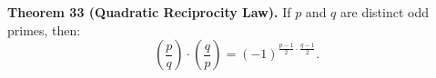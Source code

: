 \textbf{Theorem 33 (Quadratic Reciprocity Law).} If $p$ and $q$ are distinct odd primes, then:
$$\left(\frac{p}{q}\right) \cdot \left(\frac{q}{p}\right) = (-1)^{\frac{p-1}{2} \cdot \frac{q-1}{2}}.$$
